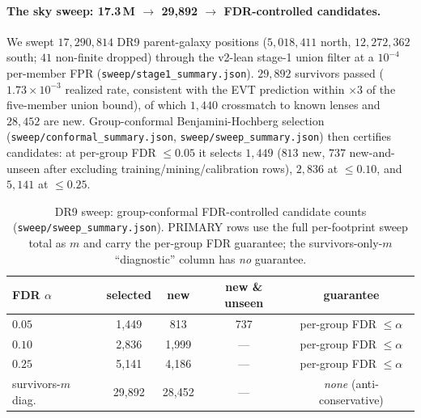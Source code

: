 \paragraph{The sky sweep: 17.3\,M $\to$ 29{,}892 $\to$ FDR-controlled candidates.} We
swept $17{,}290{,}814$ DR9 parent-galaxy positions
($5{,}018{,}411$ north, $12{,}272{,}362$ south; $41$ non-finite dropped) through the
v2-lean stage-1 union filter at a $10^{-4}$ per-member FPR
(\texttt{sweep/stage1\_summary.json}). $29{,}892$ survivors passed
($1.73\times10^{-3}$ realized rate, consistent with the EVT prediction within
$\times3$ of the five-member union bound), of which $1{,}440$ crossmatch to known
lenses and $28{,}452$ are new. Group-conformal Benjamini-Hochberg selection
(\texttt{sweep/conformal\_summary.json}, \texttt{sweep/sweep\_summary.json}) then
certifies candidates: at per-group FDR $\le0.05$ it selects $1{,}449$
($813$ new, $737$ new-and-unseen after excluding training/mining/calibration rows),
$2{,}836$ at $\le0.10$, and $5{,}141$ at $\le0.25$.

\begin{table}[t]\centering
\caption{DR9 sweep: group-conformal FDR-controlled candidate counts
(\texttt{sweep/sweep\_summary.json}). PRIMARY rows use the full per-footprint sweep
total as $m$ and carry the per-group FDR guarantee; the survivors-only-$m$
``diagnostic'' column has \emph{no} guarantee.}
\label{tab:sweep}
\small
\begin{tabular}{lcccc}
\toprule
FDR $\alpha$ & selected & new & new \& unseen & guarantee\\
\midrule
$0.05$ & 1{,}449 & 813   & 737  & per-group FDR $\le\alpha$\\
$0.10$ & 2{,}836 & 1{,}999 & --- & per-group FDR $\le\alpha$\\
$0.25$ & 5{,}141 & 4{,}186 & --- & per-group FDR $\le\alpha$\\
\midrule
survivors-$m$ diag. & 29{,}892 & 28{,}452 & --- & \emph{none} (anti-conservative)\\
\bottomrule
\end{tabular}
\end{table}

